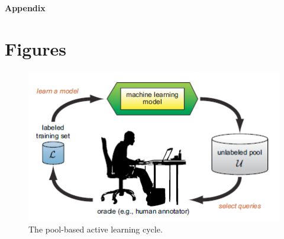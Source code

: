 \documentclass[english,12pt]{article}
\begin{document}
	
	
	\newpage
	
	
	
	\newpage
	{\huge \centering \bf Appendix \par}
	
	\appendix
	
	\section{Figures}
	\begin{figure}[H]
		\centering
		\includegraphics[width=.6\textwidth]{AL_flowchart}
		\par
		\caption{The pool-based active learning cycle. 
		\label{fig:AL_flowchart}}
	\end{figure} 
	
	
\end{document}
